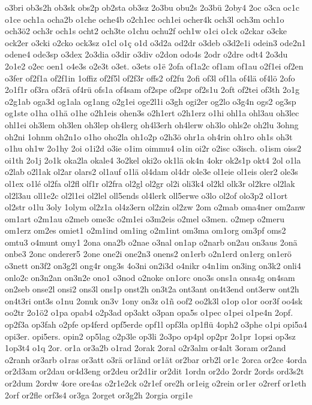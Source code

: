 {o3bri
ob3s2h
ob3sk
obs2p
ob2sta
ob3sz
2o3bu
obu2s
2o3bü
2oby4
2oc
o3ca
oc1c
o1ce
och1a
ocha2b
o1che
oche4b
o2ch1ec
och1ei
ocher4k
och3l
och3m
och1o
och3ö2
och3r
och1s
ocht2
och3te
o1chu
ochu2f
och1w
o1ci
o1ck
o2ckar
o3cke
ock2er
o3cki
o2cko
ock3sz
o1cl
o1ç
o1d
o3d2a
od2dr
o3deb
o3d2e1i
odein3
ode2n1
odene4
ode3sp
o3dex
2o3dia
o3dir
o3div
o2don
odo4s
2odr
o2dre
odt4
2o3du
2o1e2
o2ec
oen1
o4e3s
o2e3t
o3et.
o3ets
o1ë
2ofa
of1a2c
of1am
of1au
o2f1ei
of2en
o3fer
of2f1a
of2f1in
1offiz
of2f5l
of2f3r
offs2
of2fu
2ofi
of3l
of1la
of4lä
of4lö
2ofo
2o1f1r
of3ra
of3rä
of4rü
ofs1a
of4sam
of2spe
of2spr
of2s1u
2oft
of2tei
of3th
2o1g
o2g1ab
oga3d
og1ala
og1ang
o2g1ei
oge2l1i
o3gh
ogi2er
og2lo
o3g4n
ogs2
og3sp
og1ste
o1ha
o1hä
o1he
o2h1eis
ohen3s
o2h1ert
o2h1erz
o1hi
ohl1a
ohl3au
oh3lec
ohl1ei
oh3lem
oh3len
oh3lep
oh4lerg
oh4l3erh
oh4lerw
oh3lo
ohls2e
oh2lu
3ohng
oh2ni
1ohnm
oh2n1o
o1ho
oho2la
oh1o2p
o2h3ö
ohr1a
oh4rin
oh1ro
oh1s
oh3t
o1hu
oh1w
2o1hy
2oi
o1i2d
o3ie
o1im
oimmu4
o1in
oi2r
o2isc
o3isch.
o1ism
oiss2
oi1th
2o1j
2o1k
oka2la
okale4
3o2kel
oki2o
ok1lä
ok4n
4okr
ok2s1p
okt4
2ol
o1la
o2lab
o2l1ak
ol2ar
olars2
ol1auf
o1lä
ol4dam
ol4dr
ole3e
ol1eie
ol1eis
oler2
ole3s
ol1ex
o1lé
ol2fa
ol2fl
olf1r
ol2fra
ol2gl
ol2gr
ol2i
oli3k4
ol2kl
olk3r
ol2kre
ol2lak
ol2l3au
oll1e2c
ol2l1ei
ol2lel
oll5ends
ol4lerk
oll5erwe
o3lo
ol2of
olo3p2
ol1ort
ol2str
o1lu
3oly
1olym
ol2z1a
ol4z3ern
ol2zin
ol2zw
2om
o2mab
oma4ner
om2anw
om1art
o2m1au
o2meb
ome3c
o2m1ei
o3m2eis
o2mel
o3men.
o2mep
o2meru
om1erz
om2es
omiet1
o2m1ind
om1ing
o2m1int
om3ma
om1org
om3pf
oms2
omtu3
o4munt
omy1
2ona
ona2b
o2nae
o3nal
on1ap
o2narb
on2au
on3aus
2onä
onbe3
2onc
onderer5
2one
one2i
one2n3
onens2
on1erb
o2n1erd
on1erg
on1erö
o3nett
on3f2
on3g2l
ong4r
ong3s
4o3ni
on2i3d
o4nikr
o4n1im
on3ing
on3k2
onli4
onlo2c
on3n2an
on3n2e
ono1
o3nod
o2noke
on1orc
ono3s
ons1a
onsa4g
on4sam
on2seb
onse2l
onsi2
ons3l
ons1p
onst2h
on3t2a
ont3ant
on4t3end
ont3erw
ont2h
on4t3ri
ont3s
o1nu
2onuk
on3v
1ony
on3z
o1ñ
oof2
oo2k3l
o1op
o1or
oor3f
oo4sk
oo2tr
2o1ö2
o1pa
opab4
o2p3ad
op3akt
o3pan
opa5s
o1pec
o1pei
o1pe4n
2opf.
op2f3a
op3fah
o2pfe
op4ferd
opf5erde
opf1l
opf3la
op1flü
4oph2
o3phe
o1pi
opi5a4
opi3er.
opi5ers.
opin2
op5lag
o2p3le
op3li
2o3po
op4pl
op2pr
2o1pr
1opsi
op3sz
1op3t4
o1q
2or.
or1a
or3a2b
o1rad
2orak
2oral
o2r3alm
or4alt
3oram
or2and
o2ranh
or3arb
o1ras
or3att
o3rä
or1änd
or1ät
or2bar
orb2l
or1c
2orca
or2ce
4orda
or2d3am
or2dau
or4d3eng
or2deu
or2d1ir
or2dit
1ordn
or2do
2ordr
2ords
ord3s2t
or2dum
2ordw
4ore
ore4as
o2r1e2ck
o2r1ef
ore2h
or1eig
o2rein
or1er
o2rerf
or1eth
2orf
or2fle
orf3s4
or3ga
2orget
or3g2h
2orgia
orgi1e
}
